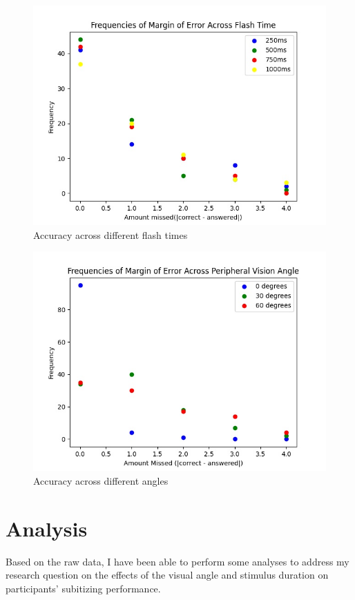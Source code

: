 \documentclass[12pt]{article}
\begin{document}
\begin{figure} [h]
\centering
\includegraphics[scale=0.5]{reaction.jpg}
\caption{Accuracy across different flash times}
\end{figure}

\begin{figure} [h]
\centering
\includegraphics[scale=0.5]{angle.jpg}
\caption{Accuracy across different angles}
\end{figure}

\newpage
\section{Analysis}

Based on the raw data, I have been able to perform some analyses to address my
research question on the effects of the visual angle and stimulus duration on
participants’ subitizing performance. 
\end{document}
